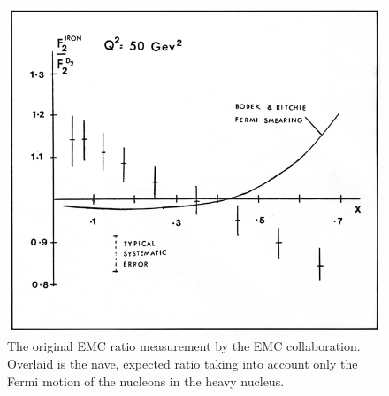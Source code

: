 \begin{figure}
	\centering
	\includegraphics[height=0.35\textheight]{figures/background/emc_effect_original-v2.jpg}
	\caption{The original EMC ratio measurement by the EMC collaboration\cite{Aubert:1983xm}. Overlaid is the nave, expected ratio taking into account only the Fermi motion of the nucleons in the heavy nucleus.}
	\label{fig:emc-one-naive}
\end{figure}

